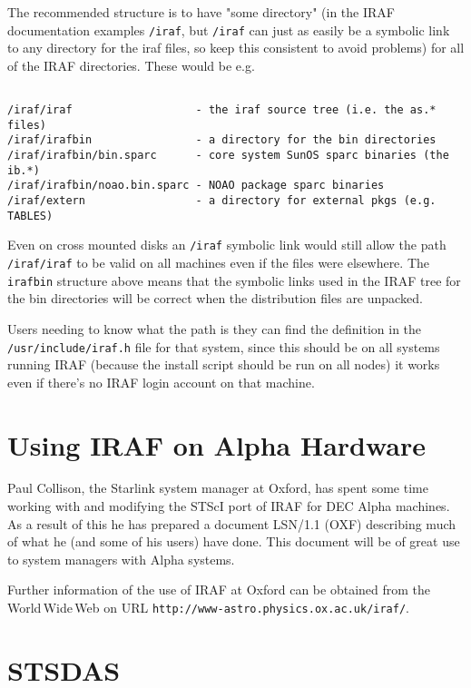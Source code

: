 The recommended structure is to have "some directory" (in the IRAF documentation
examples {\tt /iraf}, but {\tt /iraf} can just as easily be a symbolic link to
any directory for the iraf files, so keep this consistent to avoid problems)
for all of the IRAF directories.  These would be e.g.

{\footnotesize
\begin{verbatim}

/iraf/iraf                   - the iraf source tree (i.e. the as.* files)
/iraf/irafbin                - a directory for the bin directories
/iraf/irafbin/bin.sparc      - core system SunOS sparc binaries (the ib.*)
/iraf/irafbin/noao.bin.sparc - NOAO package sparc binaries
/iraf/extern                 - a directory for external pkgs (e.g. TABLES)

\end{verbatim}
}

Even on cross mounted disks an {\tt /iraf} symbolic link would still allow the
path {\tt /iraf/iraf} to be valid on all machines even if the files were elsewhere.
The {\tt irafbin} structure above means that the symbolic links used in the
IRAF tree for the bin directories will be correct when the distribution
files are unpacked.

Users needing to know what the path is they can find the
definition in the {\tt /usr/include/iraf.h} file for that system, since
this should be on all systems running IRAF (because the install script
should be run on all nodes) it works even if there's no IRAF login account
on that machine.


\section{Using IRAF on Alpha Hardware}

Paul Collison, the Starlink system manager at Oxford, has spent some
time working with and modifying the STScI port of IRAF for DEC Alpha
machines. As a result of this he has prepared a document LSN/1.1 (OXF)
describing much of what he (and some of his users) have done. This
document will be of great use to system managers with Alpha systems.

Further information of the use of IRAF at Oxford can be obtained from the
World\,Wide\,Web on URL
{\tt http://www-astro.physics.ox.ac.uk/iraf/}.

\section{STSDAS}

